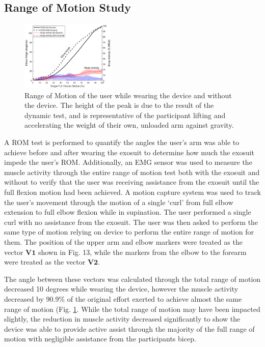 \documentclass[letterpaper, 10 pt, conference]{ieeeconf}  %
\begin{document}
\subsection{Range of Motion Study}

\begin{figure}[b!]
\centering
\includegraphics[width=0.4\textwidth]{ROM.PNG}
\caption{Range of Motion of the user while wearing the device and without the device.  The height of the peak is due to the result of the dynamic test, and is representative of the participant lifting and accelerating the weight of their own, unloaded arm against gravity.
}
\vspace{-1.5em}
\label{fig:ROM}
\end{figure}

A ROM test is performed to quantify the angles the user’s arm was able to achieve before and after wearing the exosuit to determine how much the exosuit impede the user’s ROM.   Additionally, an EMG sensor was used to measure the muscle activity through the entire range of motion test both with the exosuit and without to verify that the user was receiving assistance from the exosuit until the full flexion motion had been achieved.  A motion capture system was used to track the user’s movement through the motion of a single ‘curl’ from full elbow extension to full elbow flexion while in supination.  The user performed a single curl with no assistance from the exosuit.  The user was then asked to perform the same type of motion relying on device to perform the entire range of motion for them.  The position of the upper arm and elbow markers were treated as the vector $\textbf{V1}$ shown in Fig. 13, while the markers from the elbow to the forearm were treated as the vector $\textbf{V2}$.  

The angle between these vectors was calculated through the total range of motion decreased 10 degrees while wearing the device, however the muscle activity decreased by 90.9\% of the original effort exerted to achieve almost the same range of motion (Fig. \ref{fig:ROM}.  While the total range of motion may have been impacted slightly, the reduction in muscle activity decreased significantly to show the device was able to provide active assist through the majority of the full range of motion with negligible assistance from the participants bicep.   
\end{document}
